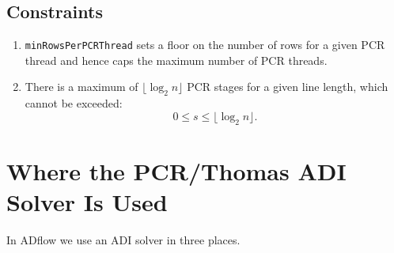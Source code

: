 \documentclass[noinfobox]{mdolab-article}
\newcommand{\nstages}{s}                        %
\newcommand{\code}[1]{\texttt{#1}}
\begin{document}
\subsection{Constraints}

\begin{enumerate}[leftmargin=*]
  \item \code{minRowsPerPCRThread} sets a floor on the number of rows for a given PCR thread and hence caps the maximum number of PCR threads.
  \item There is a maximum of $\lfloor \log_2 n \rfloor$ PCR stages for a given line length, which cannot be exceeded:
        \begin{equation}
          0 \le \nstages \le \lfloor \log_2 n \rfloor .
        \end{equation}
\end{enumerate}

\section{Where the PCR/Thomas ADI Solver Is Used}

In ADflow we use an ADI solver in three places.
\end{document}
